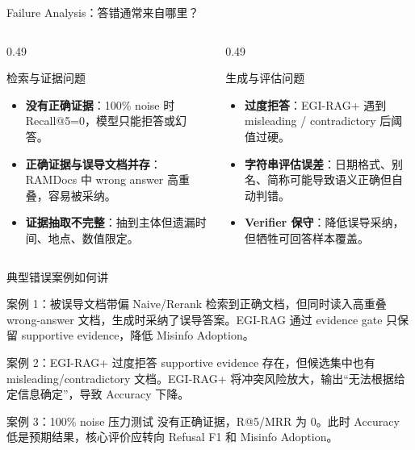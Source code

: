 \documentclass[aspectratio=169,10pt]{beamer}
\begin{document}
\begin{frame}{Failure Analysis：答错通常来自哪里？}
  \begin{columns}[T]
    \begin{column}{0.49\textwidth}
      \begin{block}{检索与证据问题}
        \begin{itemize}
          \item \textbf{没有正确证据}：100\% noise 时 Recall@5=0，模型只能拒答或幻答。
          \item \textbf{正确证据与误导文档并存}：RAMDocs 中 wrong answer 高重叠，容易被采纳。
          \item \textbf{证据抽取不完整}：抽到主体但遗漏时间、地点、数值限定。
        \end{itemize}
      \end{block}
    \end{column}
    \begin{column}{0.49\textwidth}
      \begin{block}{生成与评估问题}
        \begin{itemize}
          \item \textbf{过度拒答}：EGI-RAG+ 遇到 misleading / contradictory 后阈值过硬。
          \item \textbf{字符串评估误差}：日期格式、别名、简称可能导致语义正确但自动判错。
          \item \textbf{Verifier 保守}：降低误导采纳，但牺牲可回答样本覆盖。
        \end{itemize}
      \end{block}
    \end{column}
  \end{columns}
\end{frame}

\begin{frame}{典型错误案例如何讲}
  \begin{block}{案例 1：被误导文档带偏}
    Naive/Rerank 检索到正确文档，但同时读入高重叠 wrong-answer 文档，生成时采纳了误导答案。EGI-RAG 通过 evidence gate 只保留 supportive evidence，降低 Misinfo Adoption。
  \end{block}
  \begin{block}{案例 2：EGI-RAG+ 过度拒答}
    supportive evidence 存在，但候选集中也有 misleading/contradictory 文档。EGI-RAG+ 将冲突风险放大，输出“无法根据给定信息确定”，导致 Accuracy 下降。
  \end{block}
  \begin{block}{案例 3：100\% noise 压力测试}
    没有正确证据，R@5/MRR 为 0。此时 Accuracy 低是预期结果，核心评价应转向 Refusal F1 和 Misinfo Adoption。
  \end{block}
\end{frame}
\end{document}
